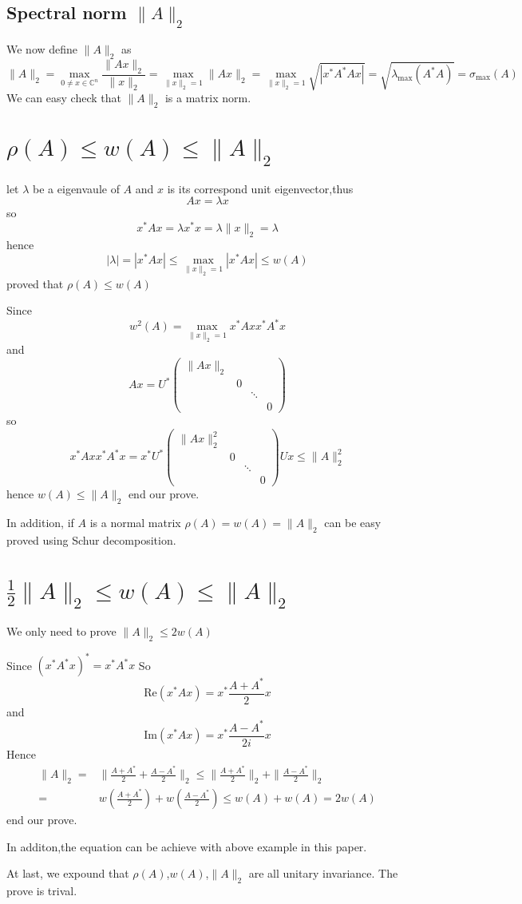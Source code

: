 \documentclass[a4paper,12pt]{article}
\begin{document}
\subsection{Spectral norm $\|A\|_2$}
We now define $\|A\|_2$ as
\[ \|A\|_2 = \max_{ 0 \neq x \in \mathbb{C}^n } \frac{\|Ax\|_2}{\|x\|_2} = \max_{\|x\|_2 = 1} \|Ax\|_2 = \max_{ \|x\|_2 = 1 } \sqrt{|x^*A^*Ax| }= \sqrt{ \lambda_{\max}(A^*A) } = \sigma_{\max}(A) \]
We can easy check that $\|A\|_2$ is a matrix norm.

\section{ $ \rho(A) \leq w(A) \leq \|A\|_2 $ }
let $\lambda$ be a eigenvaule of $A$ and $x$ is its correspond unit eigenvector,thus 
\[ Ax = \lambda x \]
so 
\[ x^*Ax = \lambda x^*x = \lambda \|x\|_2 = \lambda \]
hence 
\[ |\lambda| = |x^*Ax| \leq \max_{\|x\|_2=1} |x^*Ax| \leq w(A) \]
proved that $ \rho(A) \leq w(A) $

Since
\[ w^2(A) =  \max_{\|x\|_2=1} x^*Axx^*A^*x \]
and
\[ Ax = U^* \left( \begin{matrix}
\|Ax\|_2 \\
 & 0 \\
 & & \ddots \\
 & & & 0
\end{matrix} \right) \]
so 
\[ x^*Axx^*A^*x = x^*U^* \left( \begin{matrix}
\|Ax\|^2_2 \\
 & 0 \\
 & & \ddots \\
 & & & 0
\end{matrix} \right) Ux \leq \|A\|^2_2 \]
hence $w(A) \leq \|A\|_2 $ end our prove.

In addition, if $A$ is a normal matrix $ \rho(A) = w(A) = \|A\|_2 $ can be easy proved using Schur decomposition.

\section{$\frac{1}{2}\|A\|_2 \leq w(A) \leq \|A\|_2 $}
We only need to prove $\|A\|_2 \leq 2 w(A)$

Since $(x^*A^*x)^* = x^*A^*x $
So 
\[ \mathrm{Re}(x^*Ax) = x^* \frac{A+A^*}{2} x \]
and
\[ \mathrm{Im}(x^*Ax) = x^* \frac{A-A^*}{2i} x \]
Hence 
\[ \begin{split} 
\|A\|_2 = & \| \frac{A+A^*}{2} + \frac{A-A^*}{2} \|_2 \leq \|\frac{A+A^*}{2} \|_2 + \|\frac{A-A^*}{2}\|_2 \\
= & w(\frac{A+A^*}{2})+w(\frac{A-A^*}{2}) \leq w(A) + w(A) = 2 w(A)
\end{split} \]
end our prove.

In additon,the equation can be achieve with above example in this paper.

At last, we expound that $\rho(A)$,$w(A)$,$\|A\|_2$ are all unitary invariance. The prove is trival. 
\end{document}
